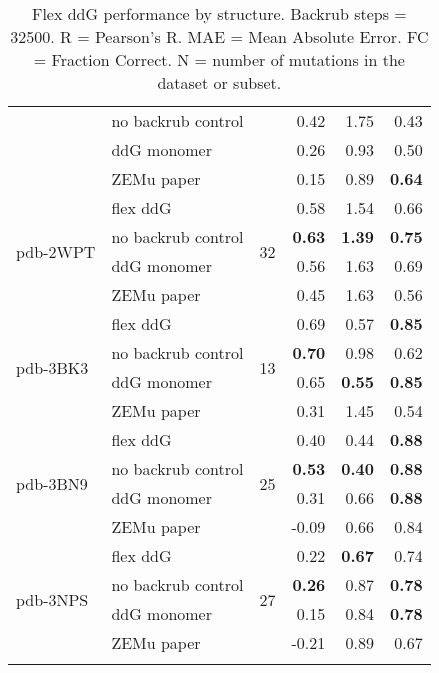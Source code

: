 {\begin{longtable}{llrrrr}
 & no backrub control & & 0.42 & 1.75 & 0.43  \\
 & ddG monomer & & 0.26 & 0.93 & 0.50  \\
 & ZEMu paper & & 0.15 & 0.89 & \textbf{0.64}  \\
\hline
 \multirow{ 4}{*}{pdb-2WPT} & flex ddG & \multirow{ 4}{*}{32} & 0.58 & 1.54 & 0.66  \\
 & no backrub control & & \textbf{0.63} & \textbf{1.39} & \textbf{0.75}  \\
 & ddG monomer & & 0.56 & 1.63 & 0.69  \\
 & ZEMu paper & & 0.45 & 1.63 & 0.56  \\
\hline
 \multirow{ 4}{*}{pdb-3BK3} & flex ddG & \multirow{ 4}{*}{13} & 0.69 & 0.57 & \textbf{0.85}  \\
 & no backrub control & & \textbf{0.70} & 0.98 & 0.62  \\
 & ddG monomer & & 0.65 & \textbf{0.55} & \textbf{0.85}  \\
 & ZEMu paper & & 0.31 & 1.45 & 0.54  \\
\hline
 \multirow{ 4}{*}{pdb-3BN9} & flex ddG & \multirow{ 4}{*}{25} & 0.40 & 0.44 & \textbf{0.88}  \\
 & no backrub control & & \textbf{0.53} & \textbf{0.40} & \textbf{0.88}  \\
 & ddG monomer & & 0.31 & 0.66 & \textbf{0.88}  \\
 & ZEMu paper & & -0.09 & 0.66 & 0.84  \\
\hline
 \multirow{ 4}{*}{pdb-3NPS} & flex ddG & \multirow{ 4}{*}{27} & 0.22 & \textbf{0.67} & 0.74  \\
 & no backrub control & & \textbf{0.26} & 0.87 & \textbf{0.78}  \\
 & ddG monomer & & 0.15 & 0.84 & \textbf{0.78}  \\
 & ZEMu paper & & -0.21 & 0.89 & 0.67  \\
 \caption[Flex ddG performance by structure]{
   Flex ddG performance by structure. Backrub steps = 32500. R = Pearson's R. MAE = Mean Absolute Error. FC = Fraction Correct. N = number of mutations in the dataset or subset.
 } \label{tab:table-by-structure}
\end{longtable}
}